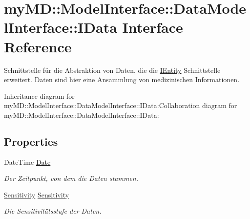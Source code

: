 \hypertarget{interfacemy_m_d_1_1_model_interface_1_1_data_model_interface_1_1_i_data}{
\section{my\-MD::Model\-Interface::Data\-Model\-Interface::IData Interface Reference}
\label{d6/d01/interfacemy_m_d_1_1_model_interface_1_1_data_model_interface_1_1_i_data}
}
Schnittstelle f\"{u}r die Abstraktion von Daten, die die \hyperlink{interfacemy_m_d_1_1_model_interface_1_1_data_model_interface_1_1_i_entity}{IEntity} Schnittstelle erweitert. Daten sind hier eine Ansammlung von medizinischen Informationen.  


Inheritance diagram for my\-MD::Model\-Interface::Data\-Model\-Interface::IData:Collaboration diagram for my\-MD::Model\-Interface::Data\-Model\-Interface::IData:\subsection*{Properties}
\begin{CompactItemize}
\item 
\hypertarget{interfacemy_m_d_1_1_model_interface_1_1_data_model_interface_1_1_i_data_44749712dbec183e983dcd78a7736c41}{
Date\-Time \hyperlink{interfacemy_m_d_1_1_model_interface_1_1_data_model_interface_1_1_i_data_44749712dbec183e983dcd78a7736c41}{Date}}
\label{d6/d01/interfacemy_m_d_1_1_model_interface_1_1_data_model_interface_1_1_i_data_44749712dbec183e983dcd78a7736c41}

\begin{CompactList}\small\item\em Der Zeitpunkt, von dem die Daten stammen. \item\end{CompactList}\item 
\hypertarget{interfacemy_m_d_1_1_model_interface_1_1_data_model_interface_1_1_i_data_456ce8fc5315d26a3f7145a5228d8fd3}{
\hyperlink{namespacemy_m_d_1_1_model_interface_1_1_data_model_interface_456ce8fc5315d26a3f7145a5228d8fd3}{Sensitivity} \hyperlink{interfacemy_m_d_1_1_model_interface_1_1_data_model_interface_1_1_i_data_456ce8fc5315d26a3f7145a5228d8fd3}{Sensitivity}}
\label{d6/d01/interfacemy_m_d_1_1_model_interface_1_1_data_model_interface_1_1_i_data_456ce8fc5315d26a3f7145a5228d8fd3}

\begin{CompactList}\small\item\em Die Sensitivit\"{a}tsstufe der Daten. \item\end{CompactList}\end{CompactItemize}


